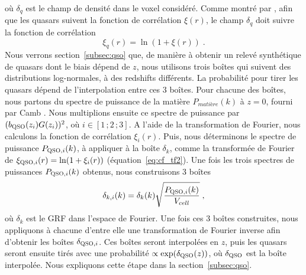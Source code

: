 \documentclass[11pt, twoside, a4paper, openright]{report}
\begin{document}
où $\delta_q$ est le champ de densité dans le voxel considéré.
Comme montré par \textcite{coles_lognormal_1991}, afin que les quasars suivent la fonction de corrélation $\xi(r)$, le champ $\delta_q$ doit suivre la fonction de corrélation 
\begin{equation}
  \label{eq:lognormal}
  \xi_q(r) = \ln(1+\xi(r)) \; .
\end{equation}
Nous verrons section~\ref{subsec:qso} que, de manière à obtenir un relevé synthétique de quasars dont le biais dépend de $z$, nous utilisons trois boîtes qui suivent des distributions log-normales, à des redshifts différents. La probabilité pour tirer les quasars dépend de l'interpolation entre ces 3 boîtes.
Pour chacune des boîtes, nous partons du spectre de puissance de la matière $P_{matière}(k)$ à $z=0$, fourni par Camb \autocite{Lewis1999}. Nous multiplions ensuite ce spectre de puissance par $(b_{\textsc{QSO}}(z_i) G(z_i))^2$, où $i \in [1\, ; 2\, ; 3]$. A l'aide de la transformation de Fourier, nous calculons la fonction de corrélation $\xi_{i}(r)$. Puis, nous déterminons le spectre de puissance $P_{\textsc{QSO},i}(k)$, à appliquer à la boîte $\delta_k$, comme la transformée de Fourier de $\xi_{\textsc{QSO},i}(r) = \ln(1+\xi_i(r))$ (équation~\ref{eq:cf_tf2}).
Une fois les trois spectres de puissances $P_{\textsc{QSO},i}(k)$ obtenus, nous construisons 3 boîtes
\begin{equation}
  \delta_{k,i}(k)  = \delta_k(k) \sqrt{\frac{P_{\textsc{QSO},i}(k)}{V_{cell}}} \; ,
\end{equation}
où $\delta_k$ est le GRF dans l'espace de Fourier. Une fois ces 3 boîtes construites, nous appliquons à chacune d'entre elle une transformation de Fourier inverse afin d'obtenir les boîtes $\delta_{\textsc{QSO}, i}$. Ces boîtes seront interpolées en $z$, puis les quasars seront ensuite tirés avec une probabilité $\propto \exp(\delta_{\textsc{QSO}}(z))$, où $\delta_{\textsc{QSO}}$ est la boîte interpolée. Nous expliquons cette étape dans la section~\ref{subsec:qso}.
\end{document}
